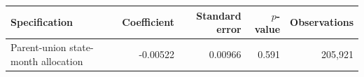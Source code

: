 \begin{tabular}{lrrrr}
\toprule
Specification & Coefficient & Standard error & $p$-value & Observations \\
\midrule
Parent-union state-month allocation & -0.00522 & 0.00966 & 0.591 & 205,921 \\
\bottomrule
\end{tabular}
